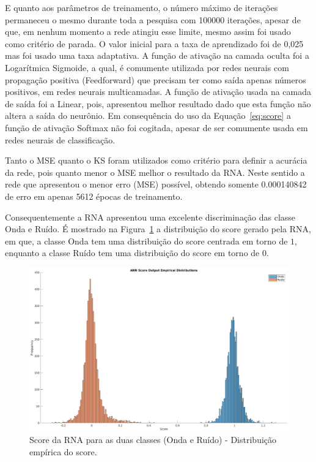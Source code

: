 E quanto aos parâmetros de treinamento, o número máximo de iterações permaneceu o mesmo durante toda a pesquisa com 100000 iterações, apesar de que, em nenhum momento a rede atingiu esse limite, mesmo assim foi usado como critério de parada. O valor inicial para a taxa de aprendizado foi de 0,025 mas foi usado uma taxa adaptativa. A função de ativação na camada oculta foi a Logarítmica Sigmoide, a qual, é comumente utilizada por redes neurais com propagação positiva (Feedforward) que precisam ter como saída apenas números positivos, em redes neurais multicamadas. A função de ativação usada na camada de saída foi a Linear, pois, apresentou melhor resultado dado que esta função não altera a saída do neurônio. Em consequência do uso da Equação~\ref{eq:score}  a função de ativação Softmax não foi cogitada, apesar de ser comumente usada em redes neurais de classificação.

Tanto o MSE quanto o KS foram utilizados como critério para definir a acurácia da rede, pois quanto menor o MSE melhor o resultado da RNA. Neste sentido a rede que apresentou o menor erro (MSE) possível, obtendo somente 0.000140842 de erro em apenas 5612 épocas de treinamento.

Consequentemente a RNA apresentou uma excelente discriminação das classe Onda e Ruído. É mostrado na Figura~\ref{fig:histograma} a distribuição do score gerado pela RNA, em que, a classe Onda tem uma distribuição do score centrada em torno de $1$, enquanto a classe Ruído tem uma distribuição do score em torno de $0$. 

\begin{figure}[H]
\centering
\includegraphics[width=1\textwidth]{figuras/histograma.eps}
\caption{Score da RNA para as duas classes (Onda e Ruído) - Distribuição empírica do score.}
\label{fig:histograma}
\end{figure}

